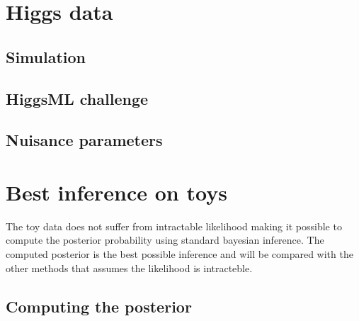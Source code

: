 \section{Higgs data} %
\label{sec:higgs_data}



\subsection{Simulation} %
\label{sub:simulation}




\subsection{HiggsML challenge} %
\label{sub:higgsml_challenge}





\subsection{Nuisance parameters} %
\label{sub:nuisance_parameters}






\section{Best inference on toys} %
\label{sec:best_inference_on_toys}

The toy data does not suffer from intractable likelihood making it possible to compute the posterior probability using standard bayesian inference.
The computed posterior is the best possible inference and will be compared with the other methods that assumes the likelihood is intracteble.

\subsection{Computing the posterior} %
\label{sub:computing_the_posterior}

